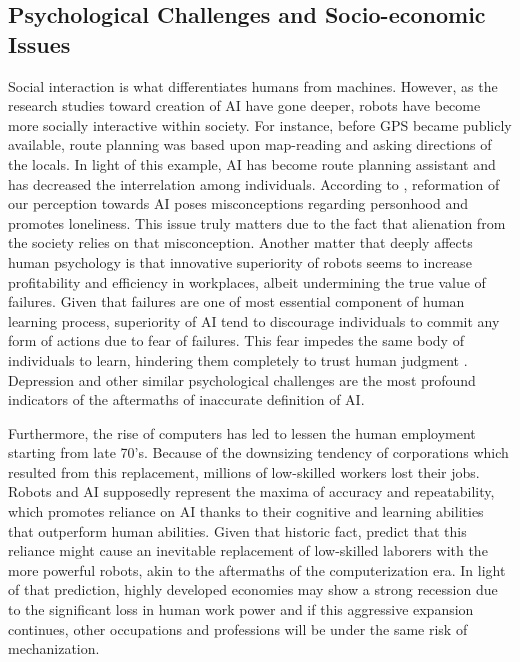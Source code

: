 \documentclass[man]{apa6}
\begin{document}
\subsection{Psychological Challenges and Socio-economic Issues}
Social interaction is what differentiates humans from machines.
However, as the research studies toward creation of AI have gone deeper, robots have become more socially interactive within society.
For instance, before GPS became publicly available, route planning was based upon map-reading and asking directions of the locals.
In light of this example, AI has become route planning assistant and has decreased the interrelation among individuals.
According to , reformation of our perception towards AI poses misconceptions regarding personhood and promotes loneliness. This issue truly matters due to the fact that alienation from the society relies on that misconception.
Another matter that deeply affects human psychology is that innovative superiority of robots seems to increase profitability and efficiency in workplaces, albeit undermining the true value of failures.
Given that failures are one of most essential component of human learning process, superiority of AI tend to discourage individuals to commit any form of actions due to fear of failures. 
This fear impedes the same body of individuals to learn, hindering them completely to trust human judgment .
Depression and other similar psychological challenges are the most profound indicators of the aftermaths of inaccurate definition of AI. \par

Furthermore, the rise of computers has led to lessen the human employment starting from late 70's.
Because of the downsizing tendency of corporations which resulted from this replacement, millions of low-skilled workers lost their jobs.
Robots and AI supposedly represent the maxima of accuracy and repeatability, which promotes reliance on AI thanks to their cognitive and learning abilities that outperform human abilities.
Given that historic fact,  predict that this reliance might cause an inevitable replacement of low-skilled laborers with the more powerful robots, akin to the aftermaths of the computerization era.
In light of that prediction, highly developed economies may show a strong recession due to the significant loss in human work power and if this aggressive expansion continues, other occupations and professions will be under the same risk of mechanization. \par
\end{document}
